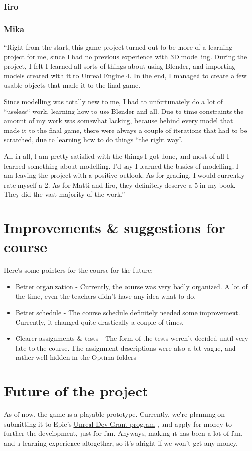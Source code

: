 \documentclass[
  oneside,
  11pt, a4paper,
  footinclude=true,
  headinclude=true,
  cleardoublepage=empty
]{scrbook}
\begin{document}
\subsection{Iiro}
\subsection{Mika}

``Right from the start, this game project turned out to be more of a learning project for me, since I had no previous experience with 3D modelling. During the project, I felt I learned all sorts of things about using Blender, and importing models created with it to Unreal Engine 4. In the end, I managed to create a few usable objects that made it to the final game.

\medskip
Since modelling was totally new to me, I had to unfortunately do a lot of “useless“ work, learning how to use Blender and all. Due to time constraints the amount of my work was somewhat lacking, because behind every model that made it to the final game, there were always a couple of iterations that had to be scratched, due to learning how to do things “the right way”.

\medskip
All in all, I am pretty satisfied with the things I got done, and most of all I learned something about modelling. I’d say I learned the basics of modelling, I am leaving the project with a positive outlook. As for grading, I would currently rate myself a 2. As for Matti and Iiro, they definitely deserve a 5 in my book. They did the vast majority of the work.''

\chapter{Improvements \& suggestions for course}
Here's some pointers for the course for the future:
\begin{itemize}
\item Better organization - Currently, the course was very badly organized. A lot of the time, even the teachers didn't have any idea what to do.

\item Better schedule - The course schedule definitely needed some improvement. Currently, it changed quite drastically a couple of times.

\item Clearer assignments \& tests - The form of the tests weren't decided until very late to the course. The assignment descriptions were also a bit vague, and rather well-hidden in the Optima folders-
\end{itemize}
\chapter{Future of the project}
As of now, the game is a playable prototype. Currently, we're planning on submitting it to Epic's \href{https://www.unrealengine.com/unrealdevgrants}{Unreal Dev Grant program} , and apply for money to further the development, just for fun. Anyways, making it has been a lot of fun, and a learning experience altogether, so it's alright if we won't get any money.
\end{document}
